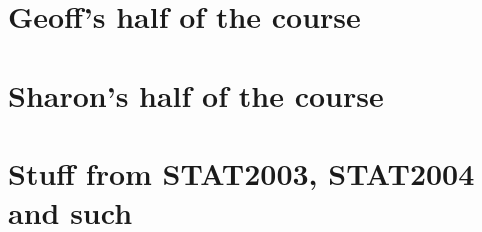 \documentclass[a4paper,12pt]{report}
\begin{document}



\part{Geoff's half of the course}




\part{Sharon's half of the course}

\part{Stuff from STAT2003, STAT2004 and such}

\end{document}
